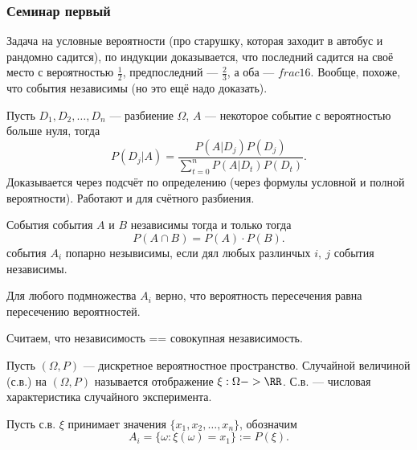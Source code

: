 \subsubsection{Семинар первый}

\begin{problem}
    Задача на условные вероятности (про старушку, которая заходит в автобус и рандомно садится), по индукции доказывается, что последний
    садится на своё место с вероятностью $\frac{1}{2}$, предпоследний --- $\frac{2}{3}$, а оба --- $frac{1}{6}$. Вообще, похоже, что события независимы
    (но это ещё надо доказать). 
\end{problem}

\begin{claim}
    Пусть $D_1, D_2, \ldots, D_n$ --- разбиение $\Omega$, $A$ --- некоторое событие с вероятностью больше нуля, тогда
    \[P(D_j | A) = \frac{P(A | D_j)P(D_j)}{\sum_{t=0}^n P(A | D_t)P(D_t)}.\]
    Доказывается через подсчёт по определению (через формулы условной и полной вероятности). Работают и для счётного разбиения. 
\end{claim}

\begin{definition}[Независимость]
    События события $A$ и $B$ независимы тогда и только тогда 
    \[P(A \cap B) = P(A) \cdot P(B).\]
    события $A_i$ попарно незывисимы, если дял любых разлинчых $i,\ j$ события независимы.
\end{definition}

\begin{definition}
    Для любого подмножества $A_i$ верно, что вероятность пересечения равна пересечению вероятностей.
\end{definition}

\begin{remark}
    Считаем, что независимость == совокупная независимость. 
\end{remark}

\begin{definition}
    Пусть $(\Omega, P)$ --- дискретное вероятностное пространство. Случайной величиной (с.в.) на $(\Omega, P)$ называется отображение $\xi: \Omega -> \RR$.
    С.в. --- числовая характеристика случайного эксперимента.
\end{definition}

\begin{definition}
    Пусть с.в. $\xi$ принимает значения $\{x_1, x_2, \ldots, x_n\}$, обозначим 
    \[A_i = \{\omega : \xi(\omega) = x_1\} := P(\xi).\]
\end{definition}